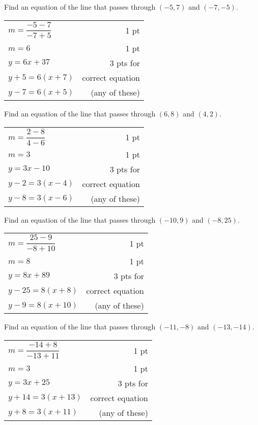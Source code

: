 {
	Find an equation of the line that passes through $(-5,7)$ and $(-7,-5)$.
}
{
	\begin{tabular}{l r}
	$m=\dfrac{-5-7}{-7+5}$ & 1 pt \\
	$m=6$ & 1 pt\\
	$y=6x+37$  & 3 pts for \\
	$y+5=6(x+7)$ & correct equation \\
	$y-7=6(x+5)$ & (any of these)
	\end{tabular}
}

{
	Find an equation of the line that passes through $(6,8)$ and $(4,2)$.
}
{
	\begin{tabular}{l r}
	$m=\dfrac{2-8}{4-6}$ & 1 pt \\
	$m=3$ & 1 pt\\
	$y=3x-10$  & 3 pts for \\
	$y-2=3(x-4)$ & correct equation \\
	$y-8=3(x-6)$ & (any of these)
	\end{tabular}
}

{
	Find an equation of the line that passes through $(-10,9)$ and $(-8,25)$.
}
{
	\begin{tabular}{l r}
	$m=\dfrac{25-9}{-8+10}$ & 1 pt \\
	$m=8$ & 1 pt\\
	$y=8x+89$  & 3 pts for \\
	$y-25=8(x+8)$ & correct equation \\
	$y-9=8(x+10)$ & (any of these)
	\end{tabular}
}

{
	Find an equation of the line that passes through $(-11,-8)$ and $(-13,-14)$.
}
{
	\begin{tabular}{l r}
	$m=\dfrac{-14+8}{-13+11}$ & 1 pt \\
	$m=3$ & 1 pt\\
	$y=3x+25$  & 3 pts for \\
	$y+14=3(x+13)$ & correct equation \\
	$y+8=3(x+11)$ & (any of these)
	\end{tabular}
}
